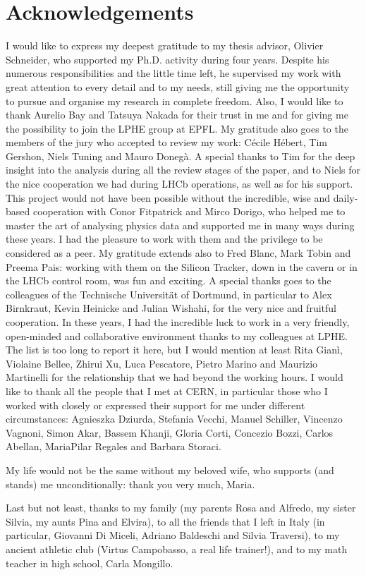 \chapter*{Acknowledgements}
\vskip0.2cm
I would like to express my deepest gratitude to my thesis advisor, Olivier Schneider, 
who supported my Ph.D. activity during four years. Despite his numerous
responsibilities and the little time left, he supervised my work with 
great attention to every detail and to my needs, still giving me the
opportunity to pursue and organise my research in complete freedom.
Also, I would like to thank
Aurelio Bay and Tatsuya Nakada for their trust in me
and for giving me the possibility to join the LPHE group at EPFL.
My gratitude also goes to the members of the jury who accepted to review my
work: C\'ecile H\'ebert, Tim Gershon, Niels Tuning and Mauro Doneg\`a.
A special thanks to Tim for the deep insight into the analysis during all the review stages of the paper,
and to Niels for the nice cooperation we had during LHCb operations, as well as for his support.   
This project would not have been possible without the incredible, wise and daily-based cooperation with 
Conor Fitpatrick and Mirco Dorigo, who helped me to master the art of analysing physics data
and supported me in many ways during these years. 
I had the pleasure to work with them and the privilege to be considered as a peer.
My gratitude extends also to Fred Blanc, Mark Tobin and Preema Pais:
working with them on the Silicon Tracker, down in the cavern or in the LHCb control room, was
fun and exciting.
A special thanks goes to the colleagues of the Technische Universit\"at of Dortmund, in particular to
Alex Birnkraut, Kevin Heinicke and Julian Wishahi, for the very nice and fruitful
cooperation. 
In these years, I had the incredible luck to work in a very friendly, open-minded and
collaborative environment thanks to my colleagues at LPHE. The list is too long
to report it here, but I would mention at least Rita Gian\`i, Violaine Bellee, 
Zhirui Xu, Luca Pescatore, Pietro Marino and Maurizio Martinelli for the relationship
that we had beyond the working hours. 
I would like to thank all the people that I met at CERN, in particular those who
I worked with closely or expressed their support for me under different circumstances:
Agnieszka Dziurda, Stefania Vecchi, Manuel Schiller, Vincenzo Vagnoni, Simon Akar, Bassem Khanji, Gloria Corti,
Concezio Bozzi, Carlos Abellan, MariaPilar Regales and Barbara Storaci.  

My life would not be the same without my beloved wife, who supports (and stands) me unconditionally: thank you very much, Maria. 

Last but not least, thanks to my family (my parents Rosa and Alfredo, my sister Silvia, my aunts Pina and Elvira), to all the friends that I left in Italy (in particular, Giovanni Di Miceli, Adriano Baldeschi and Silvia Traversi), to my ancient athletic club (Virtus Campobasso, a real life trainer!), and to my math teacher in high school, Carla Mongillo.
